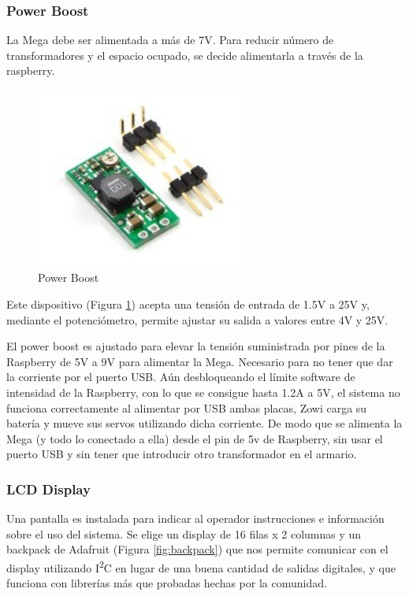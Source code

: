 \subsubsection{Power Boost}

La Mega debe ser alimentada a más de 7V. Para reducir número de transformadores y el espacio ocupado, se decide alimentarla a través de la raspberry.

\begin{figure}
\centering
\includegraphics[width=70mm]{Figures/powerBoost}
\caption{Power Boost}
\label{fig:powerBoost}
\end{figure}

Este dispositivo (Figura \ref{fig:powerBoost}) acepta una tensión de entrada de 1.5V a 25V y, mediante el potenciómetro, permite ajustar su salida a valores entre 4V y 25V.

El power boost es ajustado para elevar la tensión suministrada por pines de la Raspberry de 5V a 9V para alimentar la Mega. Necesario para no tener que dar la corriente por el puerto USB. Aún desbloqueando el límite software de intensidad de la Raspberry, con lo que se consigue hasta 1.2A a 5V, el sistema no funciona correctamente al alimentar por USB ambas placas, Zowi carga su batería y mueve sus servos utilizando dicha corriente. De modo que se alimenta la Mega (y todo lo conectado a ella) desde el pin de 5v de Raspberry, sin usar el puerto USB y sin tener que introducir otro transformador en el armario.

\subsubsection{LCD Display}

Una pantalla es instalada para indicar al operador instrucciones e información sobre el uso del sistema. Se elige un display de 16 filas x 2 columnas y un backpack de Adafruit (Figura \ref{fig:backpack}) que nos permite comunicar con el display utilizando I\textsuperscript{2}C en lugar de una buena cantidad de salidas digitales, y que funciona con librerías más que probadas hechas por la comunidad.

